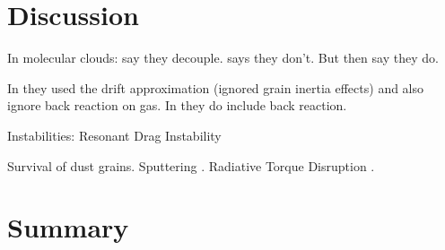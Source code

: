 
\section{Discussion}
\label{sec:discussion}

In molecular clouds:  \citet{Hopkins:2016a, Lee:2017a} say they
decouple. \citet{Tricco:2017a} says they don't.  But then
\citet{Mattsson:2019a} say they do.

In \citep{Akimkin:2015a} they used the drift approximation (ignored
grain inertia effects) and also ignore back reaction on gas. In
\citet{Akimkin:2017a} they do include back reaction.


Instabilities: Resonant Drag Instability \citep{Squire:2018a, Hopkins:2018a}

Survival of dust grains.  Sputtering \citep{Draine:2011a}.  Radiative Torque Disruption \citep{Hoang:2018a}. 

\section{Summary}
\label{sec:summary}


